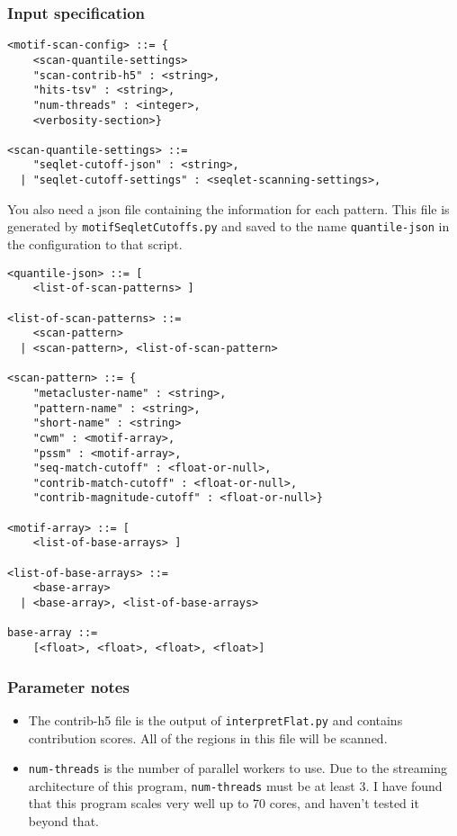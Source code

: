 \documentclass{article}
\begin{document}
\subsubsection{Input specification}

\begin{lstlisting}
<motif-scan-config> ::= {
    <scan-quantile-settings>
    "scan-contrib-h5" : <string>,
    "hits-tsv" : <string>,
    "num-threads" : <integer>,
    <verbosity-section>}

<scan-quantile-settings> ::=
    "seqlet-cutoff-json" : <string>,
  | "seqlet-cutoff-settings" : <seqlet-scanning-settings>,
\end{lstlisting}

You also need a json file containing the information for each pattern.
This file is generated by \texttt{motifSeqletCutoffs.py} and saved to the name
\texttt{quantile-json} in the configuration to that script.

\begin{lstlisting}
<quantile-json> ::= [
    <list-of-scan-patterns> ]

<list-of-scan-patterns> ::= 
    <scan-pattern>
  | <scan-pattern>, <list-of-scan-pattern>

<scan-pattern> ::= {
    "metacluster-name" : <string>,
    "pattern-name" : <string>,
    "short-name" : <string>
    "cwm" : <motif-array>,
    "pssm" : <motif-array>,
    "seq-match-cutoff" : <float-or-null>,
    "contrib-match-cutoff" : <float-or-null>,
    "contrib-magnitude-cutoff" : <float-or-null>}

<motif-array> ::= [
    <list-of-base-arrays> ]

<list-of-base-arrays> ::= 
    <base-array>
  | <base-array>, <list-of-base-arrays>

base-array ::= 
    [<float>, <float>, <float>, <float>]
\end{lstlisting}


\subsubsection{Parameter notes}
\begin{itemize}
    \item The contrib-h5 file is the output of \texttt{interpretFlat.py} and contains
        contribution scores.
        All of the regions in this file will be scanned.
    \item \texttt{num-threads} is the number of parallel workers to use.
        Due to the streaming architecture of this program, \texttt{num-threads}
        must be at least 3.
        I have found that this program scales very well up to 70 cores,
        and haven't tested it beyond that.
\end{itemize}
\end{document}
